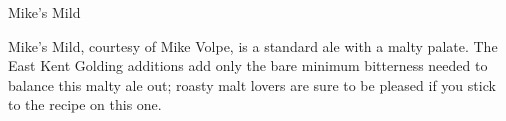 \stylesection{\stylemild}

\begin{recipie}{Mike's Mild}

\begin{aboutblock}
Mike's Mild, courtesy of Mike Volpe, is a standard ale with a malty palate. The
East Kent Golding additions add only the bare minimum bitterness needed to balance
this malty ale out; roasty malt lovers are sure to be pleased if you stick to
the recipe on this one.
\end{aboutblock}


\begin{methodandtiming}
 
\begin{mashsteps}
\end{mashsteps}

\begin{fermentationsteps}
\end{fermentationsteps}

\end{methodandtiming}

\pagebreak

\begin{ingredientsblock}

\begin{malts}
\end{malts}

\begin{hops}
\end{hops}

\begin{yeasts}
\end{yeasts}

\end{ingredientsblock}

\end{recipie}
